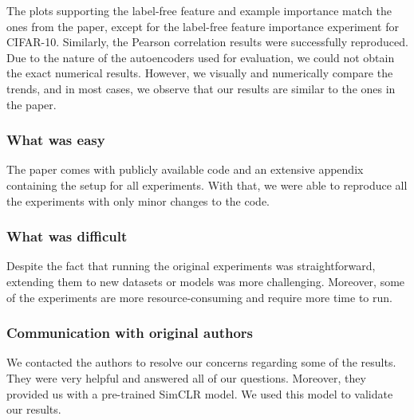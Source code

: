 
The plots supporting the label-free feature and example importance match the ones from the paper, except for the label-free feature importance experiment for CIFAR-10. Similarly, the Pearson correlation results were successfully reproduced. Due to the nature of the autoencoders used for evaluation, we could not obtain the exact numerical results. However, we visually and numerically compare the trends, and in most cases, we observe that our results are similar to the ones in the paper.

\subsubsection*{What was easy}

The paper comes with publicly available code and an extensive appendix containing the setup for all experiments. With that, we were able to reproduce all the experiments with only minor changes to the code.

\subsubsection*{What was difficult}

 Despite the fact that running the original experiments was straightforward, extending them to new datasets or models was more challenging. Moreover, some of the experiments are more resource-consuming and require more time to run.

\subsubsection*{Communication with original authors}

We contacted the authors to resolve our concerns regarding some of the results. They were very helpful and answered all of our questions. Moreover, they provided us with a pre-trained SimCLR model. We used this model to validate our results.